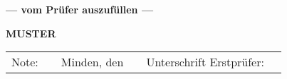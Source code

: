 \begin{coverpages}
    \begin{center}
        \textcolor{headcolor}
        {\textbf{--- vom Prüfer auszufüllen ---}}
    \end{center}
    \begin{center}
        \begin{small}
            \gradetable[h][questions]
        \end{small}
    \end{center}
    \vspace{12mm}
    \begin{center}
    \ifprintanswers
        \textcolor{dkred}{\textbf{\Huge MUSTER}}
    \else
        \begin{tabular}{lp{1cm}lp{3cm}lp{3cm}}
        Note:     & \dotfill & Minden, den & \dotfill & Unterschrift Erstprüfer: &
        \dotfill
        \end{tabular}
    \fi
    \end{center}
    \vfill
    \clearpage
    \pagebreak
\end{coverpages}




